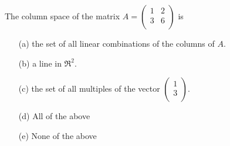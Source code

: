 \begin{problem}
    The column space of the matrix 
$A=\left( \begin{array}{cc} 1 & 2\\ 3 & 6 \\ \end{array} \right)$ is
\begin{enumerate}
    \item[(a)] the set of all linear combinations of the columns of $A$.
    \item[(b)] a line in $\Re^2$.
    \item[(c)] the set of all multiples of the vector $\left( \begin{array}{c} 1\\ 3\\ \end{array} \right)$. 
    \item[(d)] All of the above
    \item[(e)] None of the above
\end{enumerate}
\end{problem}
%             





